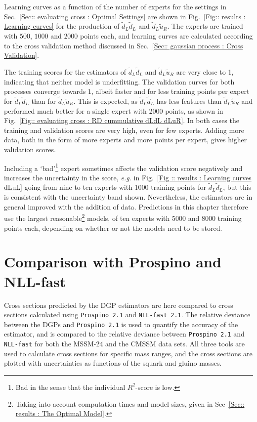 \documentclass[twoside,english]{uiofysmaster}
\begin{document}
{{Learning curves as a function of the number of experts for the settings in Sec.~\ref{Sec:: evaluating cross : Optimal Settings} are shown in Fig.~\ref{Fig:: results : Learning curves} for the production of $\widetilde{d}_L \widetilde{d}_L$ and $\widetilde{d}_L \widetilde{u}_R$. The experts are trained with $500$, $1000$ and $2000$ points each, and learning curves are calculated according to the cross validation method discussed in Sec.~\ref{Sec:: gaussian process : Cross Validation}.

The training scores for the estimators of $\widetilde{d}_L \widetilde{d}_L$ and $\widetilde{d}_L \widetilde{u}_R$ are very close to 1, indicating that neither model is underfitting. The validation curves for both processes converge towards $1$, albeit faster and for less training points per expert for $\widetilde{d}_L \widetilde{d}_L$ than for $\widetilde{d}_L \widetilde{u}_R$. This is expected, as $\widetilde{d}_L \widetilde{d}_L$ has less features than $\widetilde{d}_L \widetilde{u}_R$ and performed much better for a single expert with 2000 points, as shown in Fig.~\ref{Fig:: evaluating cross : RD cummulative dLdL dLuR}. In both cases the training and validation scores are very high, even for few experts. Adding more data, both in the form of more experts and more points per expert, gives higher validation scores. 

Including a `bad'\footnote{Bad in the sense that the individual $R^2$-score is low.} expert sometimes affects the validation score negatively and increases the uncertainty in the score, \textit{e.g.} in Fig.~\ref{Fig :: results : Learning curves dLuL} going from nine to ten experts with 1000 training points for $\widetilde{d}_L \widetilde{d}_L$, but this is consistent with the uncertainty band shown. Nevertheless, the estimators are in general improved with the addition of data. Predictions in this chapter therefore use the largest reasonable\footnote{Taking into account computation times and model sizes, given in Sec~\ref{Sec:: results : The Optimal Model}.} models, of ten experts with 5000 and 8000 training points each, depending on whether or not the models need to be stored.






\section{Comparison with Prospino and NLL-fast}

Cross sections predicted by the DGP estimators are here compared to cross sections calculated using \verb|Prospino 2.1| and \verb|NLL-fast 2.1|. The relative deviance between the DGPs and \verb|Prospino 2.1| is used to quantify the accuracy of the estimator, and is compared to the relative deviance between \verb|Prospino 2.1| and \verb|NLL-fast| for both the MSSM-24 and the CMSSM data sets. All three tools are used to calculate cross sections for specific mass ranges, and the cross sections are plotted with uncertainties as functions of the squark and gluino masses.


}}
\end{document}
